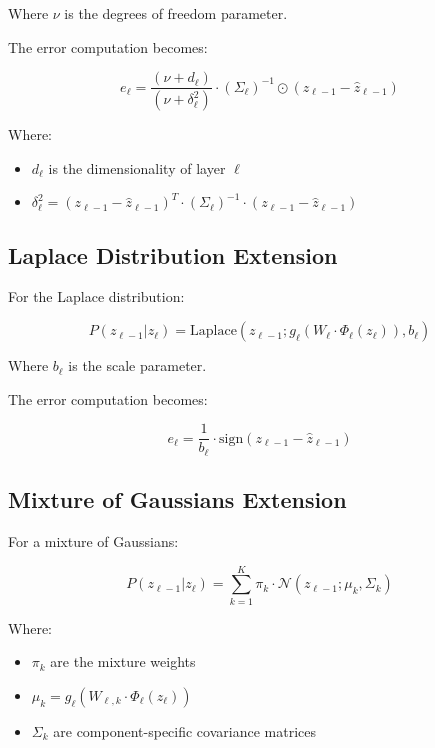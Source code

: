 \documentclass{article}
\begin{document}
Where $\nu$ is the degrees of freedom parameter.

The error computation becomes:

\begin{equation}
  e_\ell = \frac{(\nu + d_\ell)}{(\nu + \delta_\ell^2)} \cdot (\Sigma_\ell)^{-1} \odot (z_{\ell-1} - \hat{z}_{\ell-1})
\end{equation}

Where:
\begin{itemize}
  \item $d_\ell$ is the dimensionality of layer $\ell$
  \item $\delta_\ell^2 = (z_{\ell-1} - \hat{z}_{\ell-1})^T \cdot (\Sigma_\ell)^{-1} \cdot (z_{\ell-1} - \hat{z}_{\ell-1})$
\end{itemize}

\subsection{Laplace Distribution Extension}

For the Laplace distribution:

\begin{equation}
  P(z_{\ell-1}|z_\ell) = \text{Laplace}(z_{\ell-1}; g_\ell(W_\ell \cdot \Phi_\ell(z_\ell)), b_\ell)
\end{equation}

Where $b_\ell$ is the scale parameter.

The error computation becomes:

\begin{equation}
  e_\ell = \frac{1}{b_\ell} \cdot \text{sign}(z_{\ell-1} - \hat{z}_{\ell-1})
\end{equation}

\subsection{Mixture of Gaussians Extension}

For a mixture of Gaussians:

\begin{equation}
  P(z_{\ell-1}|z_\ell) = \sum_{k=1}^K \pi_k \cdot \mathcal{N}(z_{\ell-1}; \mu_k, \Sigma_k)
\end{equation}

Where:
\begin{itemize}
  \item $\pi_k$ are the mixture weights
  \item $\mu_k = g_\ell(W_{\ell,k} \cdot \Phi_\ell(z_\ell))$
  \item $\Sigma_k$ are component-specific covariance matrices
\end{itemize}
\end{document}
